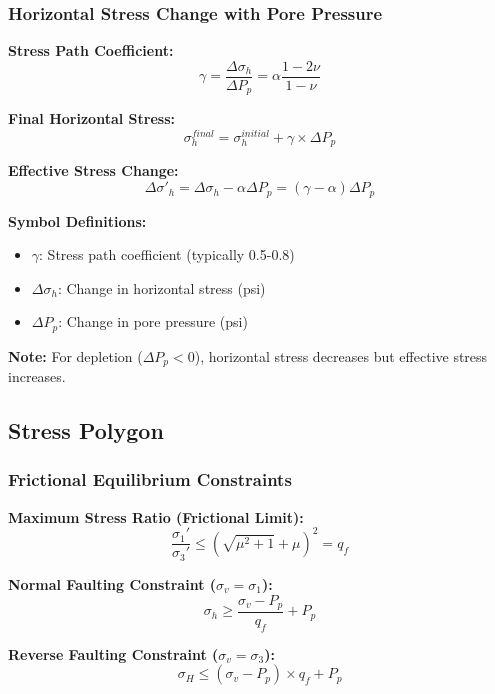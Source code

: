 \documentclass[11pt,a4paper]{article}
\newcommand{\symitem}[2]{\item \textbf{#1}: #2}
\begin{document}
\subsubsection{Horizontal Stress Change with Pore Pressure}

\begin{tcolorbox}[colback=formulabox,colframe=black!75]
\textbf{Stress Path Coefficient:}
\begin{equation}
\gamma = \frac{\Delta\sigma_h}{\Delta P_p} = \alpha \frac{1-2\nu}{1-\nu}
\end{equation}

\textbf{Final Horizontal Stress:}
\begin{equation}
\sigma_h^{final} = \sigma_h^{initial} + \gamma \times \Delta P_p
\end{equation}

\textbf{Effective Stress Change:}
\begin{equation}
\Delta\sigma'_h = \Delta\sigma_h - \alpha \Delta P_p = (\gamma - \alpha)\Delta P_p
\end{equation}
\end{tcolorbox}

\textbf{Symbol Definitions:}
\begin{itemize}[leftmargin=2cm]
\symitem{$\gamma$}{Stress path coefficient (typically 0.5-0.8)}
\symitem{$\Delta\sigma_h$}{Change in horizontal stress (psi)}
\symitem{$\Delta P_p$}{Change in pore pressure (psi)}
\end{itemize}

\textbf{Note:} For depletion ($\Delta P_p < 0$), horizontal stress decreases but effective stress increases.

\subsection{Stress Polygon}

\subsubsection{Frictional Equilibrium Constraints}

\begin{tcolorbox}[colback=formulabox,colframe=black!75]
\textbf{Maximum Stress Ratio (Frictional Limit):}
\begin{equation}
\frac{\sigma_1'}{\sigma_3'} \leq \left(\sqrt{\mu^2 + 1} + \mu\right)^2 = q_f
\end{equation}

\textbf{Normal Faulting Constraint ($\sigma_v = \sigma_1$):}
\begin{equation}
\sigma_h \geq \frac{\sigma_v - P_p}{q_f} + P_p
\end{equation}

\textbf{Reverse Faulting Constraint ($\sigma_v = \sigma_3$):}
\begin{equation}
\sigma_H \leq (\sigma_v - P_p) \times q_f + P_p
\end{equation}
\end{tcolorbox}
\end{document}
